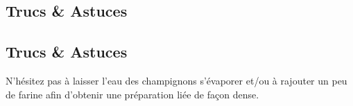     \vspace{1cm}
    \hline
    \vspace{1cm}
    
    \subsection{Trucs \& Astuces}
        \subsection{Trucs \& Astuces}
	N'hésitez pas à laisser l'eau des champignons s'évaporer et/ou à rajouter un peu de farine afin d'obtenir une préparation liée de façon dense.
